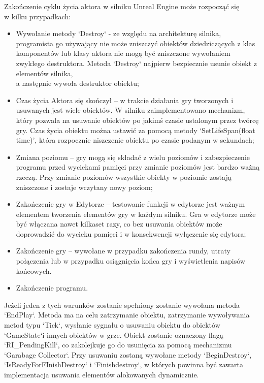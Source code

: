 \documentclass[12pt,twoside]{article}
\begin{document}
Zakończenie cyklu życia aktora w silniku Unreal Engine może rozpocząć się\\w
kilku przypadkach:
\begin{itemize}
\item Wywołanie metody `Destroy` - ze względu na architekturę silnika,
programista go używający nie może zniszczyć obiektów dziedziczących z klas
komponentów lub klasy aktora nie mogą być zniszczone wywołaniem zwykłego
destruktora. Metoda `Destroy` najpierw bezpiecznie usunie obiekt z elementów
silnika,\\a następnie wywoła destruktor obiektu;
\item Czas życia Aktora się skończył – w trakcie działania gry tworzonych i
usuwanych jest wiele obiektów. W silniku zaimplementowano mechanizm, który
pozwala na usuwanie obiektów po jakimś czasie ustalonym przez twórcę gry. Czas
życia obiektu można ustawić za pomocą metody ‘SetLifeSpan(float time)’, która
rozpocznie niszczenie obiektu po czasie podanym w sekundach;
\item Zmiana poziomu – gry mogą się składać z wielu poziomów i zabezpieczenie
programu przed wyciekami pamięci przy zmianie poziomów jest bardzo ważną rzeczą.
Przy zmianie poziomów wszystkie obiekty w poziomie zostają zniszczone i zostaje
wczytany nowy poziom; 
\item Zakończenie gry w Edytorze – testowanie funkcji w edytorze jest ważnym
elementem tworzenia elementów gry w każdym silniku. Gra w edytorze może być
włączana nawet kilkaset razy, co bez usuwania obiektów może doprowadzić do
wycieku pamięci i w konsekwencji wyłączenie się edytora;
\item Zakończenie gry – wywołane w przypadku zakończenia rundy, utraty
połączenia lub w przypadku osiągnięcia końca gry i wyświetlenia napisów
końcowych. 
\item Zakończenie programu.
\end{itemize}

Jeżeli jeden z tych warunków zostanie spełniony zostanie wywołana metoda
`EndPlay`. Metoda ma na celu zatrzymanie obiektu, zatrzymanie wywoływania metod
typu `Tick`, wysłanie sygnału o usuwaniu obiektu do obiektów `GameState`i innych
obiektów w grze. Obiekt zostanie oznaczony flagą `RI\_PendingKill`, co
zakolejkuje go do usunięcia za pomocą mechanizmu `Garabage Collector`. Przy
usuwaniu zostaną wywołane metody `BeginDestroy`, `IsReadyForFInishDestroy` i
`Finishdestroy`, w których powinna być zawarta implementacja usuwania elementów
alokowanych dynamicznie.  
\end{document}
